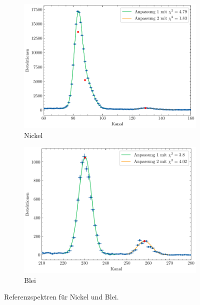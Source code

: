 \begin{figure}[H]
    \centering
    \begin{subfigure}{0.45\textwidth}
        \centering
        \includegraphics[width=\linewidth]{../figs/Fe}
        \caption{Nickel}
    \end{subfigure}
    \begin{subfigure}{0.45\textwidth}
        \centering
        \includegraphics[width=\linewidth]{../figs/Mo}
        \caption{Blei}
    \end{subfigure}
    \caption{Referenzspektren für Nickel und Blei.}\label{fig:ni_pb}
\end{figure}
